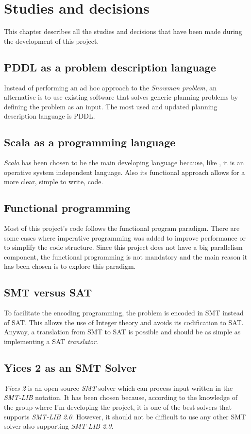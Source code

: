 \documentclass{report}
\theoremstyle{plain}
\begin{document}
\chapter{Studies and decisions}
This chapter describes all the studies and decisions that have been made during the development of this project.

\section{PDDL as a problem description language}
Instead of performing an ad hoc approach to the \emph{Snowman problem}, an alternative is to use existing software that solves generic planning problems by defining the problem as an input. The most used and updated planning description language is  PDDL.

\section{Scala as a programming language}
\emph{Scala} has been chosen to be the main developing language because, like , it is an operative system independent language. Also its functional approach allows for a more clear, simple to write, code.

\section{Functional programming}
Most of this project's code follows the functional program paradigm. There are some cases where imperative programming was added to improve performance or to simplify the code structure. Since this project does not have a big parallelism component, the functional programming is not mandatory and the main reason it has been chosen is to explore this paradigm.

\section{SMT versus SAT}
To facilitate the encoding programming, the problem is encoded in SMT instead of SAT. This allows the use of Integer theory and avoids its codification to SAT. Anyway, a translation from SMT to SAT is possible and should be as simple as implementing a SAT \emph{translator}.

\section{Yices 2 as an SMT Solver}
\emph{Yices 2}\cite{yices2,yices} is an open source \emph{SMT} solver which can process input written in the \emph{SMT-LIB} notation. It has been chosen because, according to the knowledge of the group where I'm developing the project, it is one of the best solvers that supports \emph{SMT-LIB 2.0}. However, it should not be difficult to use any other SMT solver also supporting \emph{SMT-LIB 2.0}.
\end{document}
